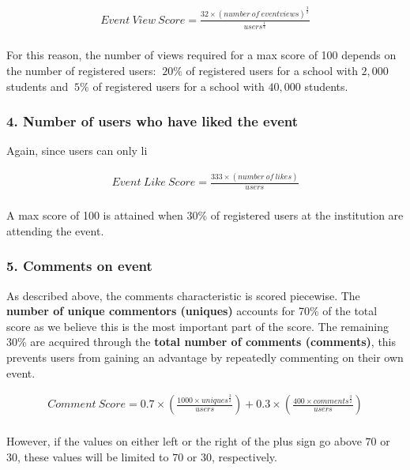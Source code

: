 \documentclass[12pt]{amsart}
\begin{document}
	\begin{align*}
		Event \ View \ Score = \frac{32\times(number \ of \ event views)^{\frac{3}{2}}}{users^{\frac{1}{4}}}\\
	\end{align*}
	
\noindent For this reason, the number of views required for a max score of 100 depends on the number of registered users: $~20\%$ of registered users for a school with $2,000$ students and $~5\%$ of registered users for a school with $40,000$ students.

\medskip

\subsubsection*{4. Number of users who have liked the event}

Again, since users can only li

	\begin{align*}
		Event \ Like \ Score = \frac{333\times(number \ of \ likes)}{users}\\
	\end{align*}
	
\noindent A max score of 100 is attained when 30\% of registered users at the institution are attending the event.

\medskip

\subsubsection*{5. Comments on event}

As described above, the comments characteristic is scored piecewise. The \textbf{number of unique commentors (uniques)} accounts for 70\% of the total score as we believe this is the most important part of the score. The remaining 30\% are acquired through the \textbf{total number of comments (comments)}, this prevents users from gaining an advantage by repeatedly commenting on their own event.

	\begin{align*}
		Comment \ Score = 0.7 \times \left(\frac{1000 \times uniques^{\frac{3}{2}}}{users}\right) + 0.3 \times \left(\frac{400 \times comments^{\frac{3}{2}}}{users}\right)\\
	\end{align*}
	
\noindent However, if the values on either left or the right of the plus sign go above $70$ or $30$, these values will be limited to $70$ or $30$, respectively.
\end{document}
